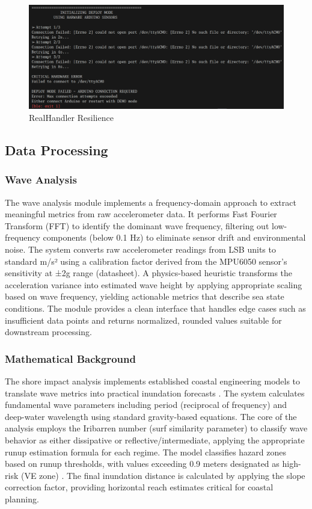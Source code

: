 \documentclass{article}
\begin{document}
    \begin{figure} [h]
        \centering
        \includegraphics[width=0.75\linewidth]{assets/RealHandler.png}
        \caption{RealHandler Resilience}
        \label{fig:enter-label}
    \end{figure}

\subsection{Data Processing}

    \subsubsection{Wave Analysis}
    The wave analysis module implements a frequency-domain approach to extract meaningful metrics from raw accelerometer data. It performs Fast Fourier Transform (FFT) to identify the dominant wave frequency, filtering out low-frequency components (below 0.1 Hz) to eliminate sensor drift and environmental noise. The system converts raw accelerometer readings from LSB units to standard m/s² using a calibration factor derived from the MPU6050 sensor's sensitivity at ±2g range (datasheet). A physics-based heuristic transforms the acceleration variance into estimated wave height by applying appropriate scaling based on wave frequency, yielding actionable metrics that describe sea state conditions. The module provides a clean interface that handles edge cases such as insufficient data points and returns normalized, rounded values suitable for downstream processing.

    \subsubsection{Mathematical Background}
    The shore impact analysis implements established coastal engineering models to translate wave metrics into practical inundation forecasts \cite{stockdon2006}. The system calculates fundamental wave parameters including period (reciprocal of frequency) and deep-water wavelength using standard gravity-based equations. The core of the analysis employs the Iribarren number (surf similarity parameter) to classify wave behavior as either dissipative or reflective/intermediate, applying the appropriate runup estimation formula for each regime. The model classifies hazard zones based on runup thresholds, with values exceeding 0.9 meters designated as high-risk (VE zone) \cite{fema2022}. The final inundation distance is calculated by applying the slope correction factor, providing horizontal reach estimates critical for coastal planning.
\end{document}
